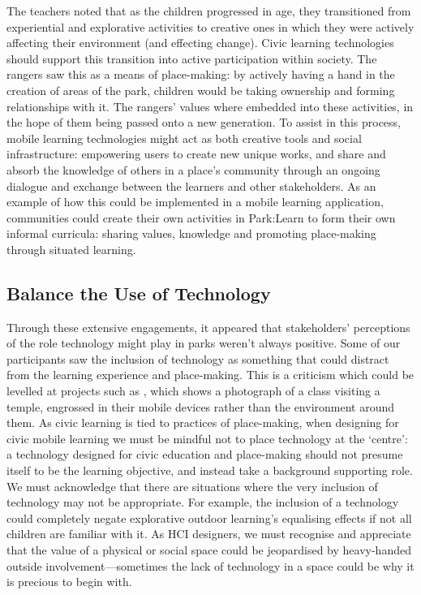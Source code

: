 The teachers noted that as the children progressed in age, they transitioned from experiential and explorative activities to creative ones in which they were actively affecting their environment (and effecting change). Civic learning technologies should support this transition into active participation within society. The rangers saw this as a means of place-making: by actively having a hand in the creation of areas of the park, children would be taking ownership and forming relationships with it. The rangers’ values where embedded into these activities, in the hope of them being passed onto a new generation. To assist in this process, mobile learning technologies might act as both creative tools and social infrastructure: empowering users to create new unique works, and share and absorb the knowledge of others in a place’s community through an ongoing dialogue and exchange between the learners and other stakeholders. As an example of how this could be implemented in a mobile learning application, communities could create their own activities in Park:Learn to form their own informal curricula: sharing values, knowledge and promoting place-making through situated learning.

\subsection{Balance the Use of Technology}

Through these extensive engagements, it appeared that stakeholders’ perceptions of the role technology might play in parks weren't always positive. Some of our participants saw the inclusion of technology as something that could distract from the learning experience and place-making. This is a criticism which could be levelled at projects such as \citep{Shih2010}, which shows a photograph of a class visiting a temple, engrossed in their mobile devices rather than the environment around them. As civic learning is tied to practices of place-making, when designing for civic mobile learning we must be mindful not to place technology at the `centre': a technology designed for civic education and place-making should not presume itself to be the learning objective, and instead take a background supporting role. We must acknowledge that there are situations where the very inclusion of technology may not be appropriate. For example, the inclusion of a technology could completely negate explorative outdoor learning’s equalising effects if not all children are familiar with it. As HCI designers, we must recognise and appreciate that the value of a physical or social space could be jeopardised by heavy-handed outside involvement—sometimes the lack of technology in a space could be why it is precious to begin with.

